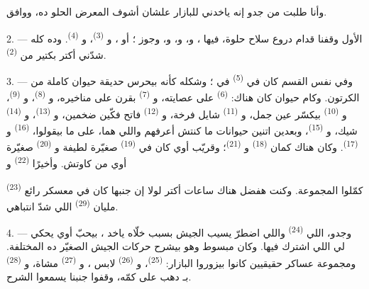 وأنا طلبت من جدو إنه ياخدني للبازار علشان أشوف المعرض الحلو ده، ووافق.

2. --- الأول وقفنا قدام دروع سلاح حلوة، فيها ،
و، و، و، وجوز ؛ أو
، و \textsuperscript{(3)}، و \textsuperscript{(4)}.
وده كله شدّني أكتر بكتير من  \textsuperscript{(2)}.

\VUsaut{3.0mm}
\VUsaut{2.6mm}

3. --- وفي نفس القسم كان في  \textsuperscript{(5)} في ؛
وشكله كأنه بيحرس حديقة حيوان كاملة من الكرتون. وكام حيوان كان هناك:
 \textsuperscript{(6)} على عصايته، و \textsuperscript{(7)}
بقرن على مناخيره، و \textsuperscript{(8)}، و
\textsuperscript{(9)}، و \textsuperscript{(10)} بيكسّر عين جمل،
و \textsuperscript{(11)} شايل فرخة، و \textsuperscript{(12)}
فاتح فكّين ضخمين، و \textsuperscript{(13)}، و
\textsuperscript{(14)} شيك، و \textsuperscript{(15)}، وبعدين اتنين حيوانات ما
كنتش أعرفهم واللي هما، على ما بيقولوا،  \textsuperscript{(16)}
و \textsuperscript{(17)}. وكان هناك كمان  \textsuperscript{(18)}
و \textsuperscript{(21)}؛ وقريّب أوي كان في 
\textsuperscript{(19)} صغيّرة لطيفة و \textsuperscript{(20)} صغيّرة أوي من
كاوتش. وأخيرًا  \textsuperscript{(22)} و

 \textsuperscript{(23)} كمّلوا المجموعة. وكنت هفضل هناك ساعات
أكتر لولا إن جنبها كان في معسكر رائع مليان  \textsuperscript{(29)}
اللي شدّ انتباهي.

\VUsaut{4.0mm}
\VUsaut{2.8mm}

4. --- وجدو، اللي  \textsuperscript{(24)} واللي اضطرّ يسيب الجيش بسبب
 خلّاه ياخد ، بيحبّ أوي يحكي لي 
اللي اشترك فيها. وكان مبسوط وهو بيشرح حركات الجيش الصغيّر ده المختلفة. ومجموعة
عساكر حقيقيين كانوا بيزوروا البازار:  \textsuperscript{(25)}،
و \textsuperscript{(26)} لابس ،
و \textsuperscript{(27)} مشاة، و
\textsuperscript{(28)} بـ دهب على كمّه، وقفوا جنبنا يسمعوا الشرح.

